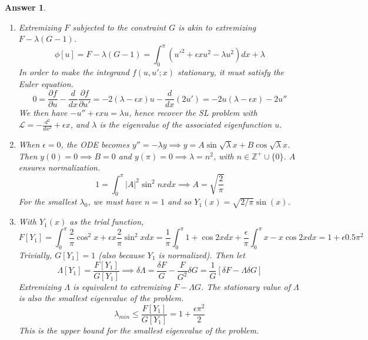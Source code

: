 \documentclass[a4paper]{article}
\newtheorem{ans}{Answer}[section]
\theoremstyle{new}
\begin{document}
\begin{ans}\leavevmode
\begin{enumerate}[label=(\alph*)]
\item Extremizing $F$ subjected to the constraint $G$ is akin to extremizing $F-\lambda(G-1)$.
$$\phi[u]=F-\lambda(G-1)=\int_0^\pi(u'^2+\epsilon xu^2-\lambda u^2)dx+\lambda$$
In order to make the integrand $f(u,u';x)$ stationary, it must satisfy the Euler equation.
$$0=\frac{\partial f}{\partial u}-\frac{d}{dx}\frac{\partial f}{\partial u'}=-2(\lambda-\epsilon x)u-\frac{d}{dx}(2u')=-2u(\lambda-\epsilon x)-2u''$$
We then have $-u''+\epsilon xu=\lambda u$, hence recover the SL problem with $\mathcal{L}=-\frac{d^2}{dx^2}+\epsilon x$, and $\lambda$ is the eigenvalue of the associated eigenfunction $u$.
\item When $\epsilon=0$, the ODE becomes $y''=-\lambda y\implies y=A\sin\sqrt{\lambda }x+B\cos\sqrt{\lambda} x$. Then $y(0)=0\implies B=0$ and $y(\pi)=0\implies\lambda=n^2$, with $n\in\mathbb{Z}^+\cup\{0\}$. $A$ ensures normalization.
$$1=\int_0^\pi|A|^2\sin^2nxdx\implies A=\sqrt{\frac{2}{\pi}}$$
For the smallest $\lambda_0$, we must have $n=1$ and so $Y_1(x)=\sqrt{2/\pi}\sin(x)$. 
\item With $Y_1(x)$ as the trial function,
$$F[Y_1]=\int_0^\pi\frac{2}{\pi}\cos^2x+\epsilon x\frac{2}{\pi}\sin^2xdx=\frac{1}{\pi}\int_0^\pi 1+\cos 2xdx+\frac{\epsilon}{\pi}\int_0^\pi x-x\cos 2xdx=1+\epsilon 0.5\pi^2$$
Trivially, $G[Y_1]=1$ (also because $Y_1$ is normalized). Then let
$$\Lambda[Y_1]=\frac{F[Y_1]}{G[Y_1]}\implies\delta\Lambda=\frac{\delta F}{G}-\frac{F}{G^2}\delta G=\frac{1}{G}[\delta F-\Lambda\delta G]$$
Extremizing $\Lambda$ is equivalent to extremizing $F-\Lambda G$. The stationary value of $\Lambda$ is also the smallest eigenvalue of the problem. 
$$\lambda_{min}\leq\frac{F[Y_1]}{G[Y_1]}=1+\frac{\epsilon\pi^2}{2}$$
This is the upper bound for the smallest eigenvalue of the problem.
\end{enumerate}
\end{ans}
\newpage
\end{document}
